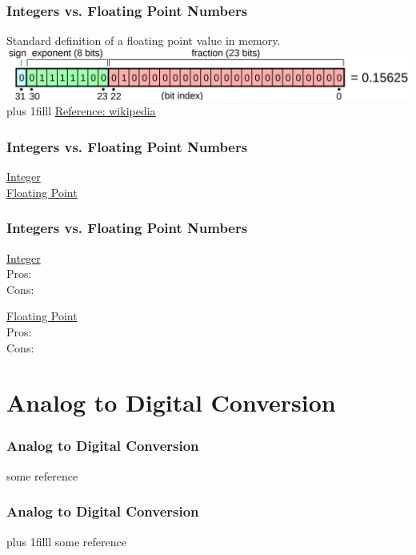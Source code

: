 \documentclass[fleqn]{beamer} %
\newcommand{\sectiontitleIII}{Integers vs. Floating Point Numbers}
\newcommand{\sectiontitleIV}{Analog to Digital Conversion}
\newcommand{\btVFill}{\vskip0pt plus 1filll}
\begin{document}
\begin{frame}[label=sectionIII] \small
 
  \frametitle{\sectiontitleIII}
  
  Standard definition of a floating point value in memory.\\	
  \includegraphics[scale=.10]{ieee754_bits.png}	
  \btVFill
	\href{https://en.wikipedia.org/wiki/IEEE_754}{Reference: wikipedia}
 
\end{frame}
	
\begin{frame}[label=sectionIII] \small
\frametitle{\sectiontitleIII}
\begin{multicols}{2}
	\underline{Integer} \vspace{20mm}\\
	
	\underline{Floating Point} \vspace{20mm}\\
	
\end{multicols}
\end{frame}

\begin{frame}[label=sectionIII] \small
\frametitle{\sectiontitleIII}
\begin{multicols}{2}
\underline{Integer} \vspace{20mm}\\
Pros:\vspace{10mm}\\
Cons:

\underline{Floating Point} \vspace{20mm}\\	
Pros:\vspace{10mm}\\
Cons:
\end{multicols}
\end{frame}


\section{\sectiontitleIV}	

\begin{frame}[label=sectionIV] \small
\frametitle{\sectiontitleIV}
\bigskip

\vspace{50mm}
\tiny{some reference}	
\end{frame}

\begin{frame}[label=sectionIV] \small
\frametitle{\sectiontitleIV}
\bigskip



\btVFill
\tiny{some reference}	
\end{frame}
\end{document}
